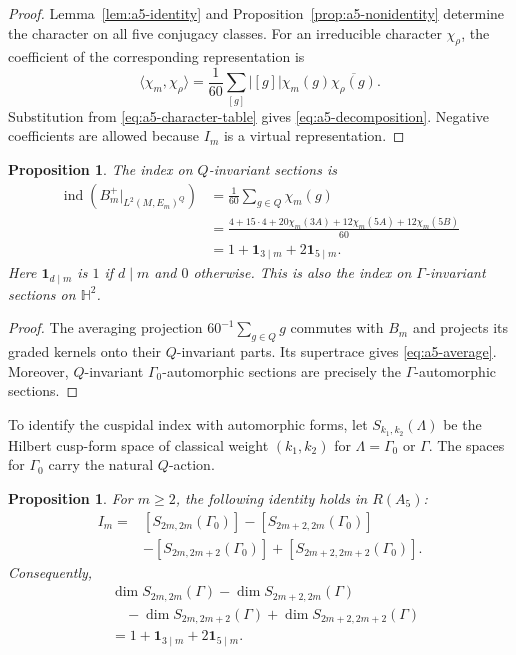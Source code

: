 \documentclass[11pt]{article}
\theoremstyle{definition}
\theoremstyle{plain}
\numberwithin{equation}{section}
\newtheorem{proposition}[theorem]{Proposition}
\newcommand{\HH}{\mathbb H}
\begin{document}
\begin{proof}
Lemma~\ref{lem:a5-identity} and
Proposition~\ref{prop:a5-nonidentity} determine the character
on all five conjugacy classes. For an irreducible character
$\chi_\rho$, the coefficient of the corresponding representation
is
\[
\langle\chi_m,\chi_\rho\rangle
=\frac1{60}\sum_{[g]}|[g]|\chi_m(g)
                         \overline{\chi_\rho(g)}.
\]
Substitution from \eqref{eq:a5-character-table} gives
\eqref{eq:a5-decomposition}. Negative coefficients are allowed
because $I_m$ is a virtual representation.
\end{proof}

\begin{proposition}\label{cor:a5-invariant}
The index on $Q$-invariant sections is
\begin{equation}\label{eq:a5-average}
\begin{aligned}
\operatorname{ind}(B_m^+|_{L^2(M,E_m)^Q})
&=\frac1{60}\sum_{g\in Q}\chi_m(g)\\
&=\frac{4+15\cdot4+20\chi_m(3A)
       +12\chi_m(5A)+12\chi_m(5B)}{60}\\
&=1+\mathbf1_{3\mid m}+2\mathbf1_{5\mid m}.
\end{aligned}
\end{equation}
Here $\mathbf1_{d\mid m}$ is $1$ if $d\mid m$ and $0$
otherwise. This is also the index on $\Gamma$-invariant
sections on $\HH^2$.
\end{proposition}

\begin{proof}
The averaging projection $60^{-1}\sum_{g\in Q}g$ commutes
with $B_m$ and projects its graded kernels onto their
$Q$-invariant parts. Its supertrace gives
\eqref{eq:a5-average}. Moreover, $Q$-invariant
$\Gamma_0$-automorphic sections are precisely the
$\Gamma$-automorphic sections.
\end{proof}

To identify the cuspidal index with automorphic forms,
let $S_{k_1,k_2}(\Lambda)$ be the Hilbert cusp-form space
of classical weight $(k_1,k_2)$ for
$\Lambda=\Gamma_0$ or $\Gamma$.
The spaces for $\Gamma_0$ carry the natural $Q$-action.

\begin{proposition}\label{cor:a5-cusp-forms}
For $m\geq2$, the following identity holds in $R(A_5)$:
\begin{equation}\label{eq:a5-four-cusp-forms}
\begin{aligned}
I_m={}&[S_{2m,2m}(\Gamma_0)]
      -[S_{2m+2,2m}(\Gamma_0)]\\
     &-[S_{2m,2m+2}(\Gamma_0)]
      +[S_{2m+2,2m+2}(\Gamma_0)].
\end{aligned}
\end{equation}
Consequently,
\begin{equation}\label{eq:a5-full-group}
\begin{aligned}
&\dim S_{2m,2m}(\Gamma)
-\dim S_{2m+2,2m}(\Gamma)\\
&\quad-\dim S_{2m,2m+2}(\Gamma)
+\dim S_{2m+2,2m+2}(\Gamma)\\
&=1+\mathbf1_{3\mid m}+2\mathbf1_{5\mid m}.
\end{aligned}
\end{equation}
\end{proposition}
\end{document}

